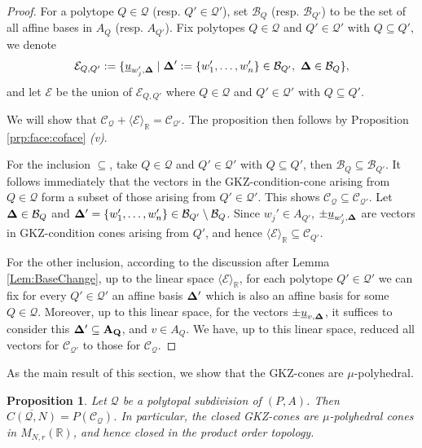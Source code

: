 \documentclass[12pt, a4article]{amsart}   	%
\numberwithin{equation}{section}
\theoremstyle{plain}
\newtheorem{proposition}[theorem]{Proposition}
\theoremstyle{definition}
\newcommand{\R}{{\mathbb R}}
\newcommand{\bfDelta}{{\bf \Delta}}
\newcommand{\mcC}{{\mathcal C}}
\newcommand{\mcQ}{{\mathcal Q}}
\newcommand{\MNaR}{M_{N,r}(\R)}
\begin{document}
\begin{proof}

For a polytope $Q\in\mathcal{Q}$ (resp. $Q'\in\mathcal{Q'}$), set $\mathcal{B}_Q$ (resp. $\mathcal{B}_{Q'}$) to be the set of all affine bases in $A_Q$ (resp. $A_{Q'}$). Fix polytopes $Q\in\mathcal{Q}$ and $Q'\in\mathcal{Q}'$ with $Q\subseteq Q'$, we denote
$$\mathcal{E}_{Q,Q'}:=\{\underline{u}_{w_j',\bfDelta}\mid \bfDelta':=\{w_1',\ldots,w_n'\}\in\mathcal{B}_{Q'},\ \bfDelta\in\mathcal{B}_{Q}\},$$
and let $\mathcal{E}$ be the union of $\mathcal{E}_{Q,Q'}$ where $Q\in\mathcal{Q}$ and $Q'\in\mathcal{Q}'$ with $Q\subseteq Q'$.

We will show that $\mathcal{C}_{\mathcal{Q}}+\langle\mathcal{E}\rangle_{\mathbb{R}}=\mathcal{C}_{\mathcal{Q}'}$. The proposition then follows by Proposition \ref{prp:face:coface} \emph{(v)}.

For the inclusion $\subseteq$, take $Q\in\mathcal{Q}$ and $Q'\in\mathcal{Q}'$ with $Q\subseteq Q'$, then $\mathcal{B}_Q\subseteq\mathcal{B}_{Q'}$. It follows immediately that the vectors in the GKZ-condition-cone arising from $Q\in\mathcal{Q}$ form a subset of those arising from $Q'\in\mathcal{Q}'$. This shows $\mathcal{C}_{\mathcal{Q}}\subseteq\mathcal{C}_{\mathcal{Q}'}$. Let $\bfDelta\in\mathcal{B}_Q$ and $\bfDelta'=\{w_1',\ldots,w_n'\}\in\mathcal{B}_{Q'}\setminus\mathcal{B}_Q$. Since $w_j'\in A_{Q'}$, $\pm \underline{u}_{w_j',\bfDelta}$ are vectors in GKZ-condition cones arising from $Q'$, and hence $\langle\mathcal{E}\rangle_{\mathbb{R}}\subseteq\mathcal{C}_{Q'}$.

For the other inclusion, according to the discussion after Lemma \ref{Lem:BaseChange}, up to the linear space $\langle\mathcal{E}\rangle_{\mathbb{R}}$, for each polytope $Q'\in\mathcal{Q}'$ we can fix for every $Q'\in\mathcal{Q'}$ an affine basis $\bfDelta'$ which is also an affine basis for some $Q\in\mathcal{Q}$. Moreover, up to this linear space, for the vectors $\pm\underline{u}_{v,\bfDelta}$, it suffices to consider this $\bf\Delta'\subseteq A_Q$, and $v\in A_Q$. We have, up to this linear space, reduced all vectors for $\mathcal{C}_{\mathcal{Q}'}$ to those for $\mathcal{C}_{\mathcal{Q}}$.
\end{proof}

As the main result of this section, we show that the GKZ-cones are $\mu$-polyhedral.

\begin{proposition}\label{prp:gkz:as:polar}
Let $\mcQ$ be a polytopal subdivision of $(P,A)$. Then $\overline{C(\mcQ,N)} = P(\mcC_\mcQ)$. In particular, the closed GKZ-cones are $\mu$-polyhedral cones in $\MNaR$, and hence closed in the product order topology.
\end{proposition}
\end{document}

